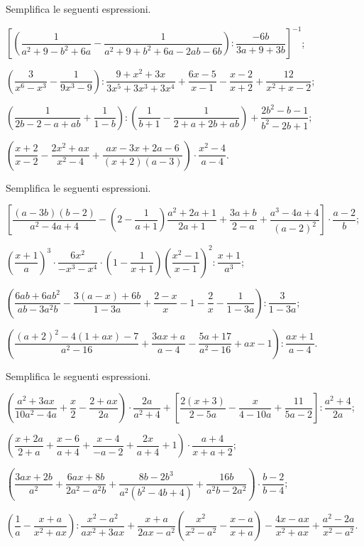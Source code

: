 \begin{esercizio}[\Ast]
\label{ese:14.50}
Semplifica le seguenti espressioni.
\begin{enumeratea}
 \item $\left[\left(\dfrac{1}{a^{2}+9-b^{2}+6a}-\dfrac{1}{a^{2}+9+b^{2}+6a-2ab-6b}\right):\dfrac{-6b}{3a+9+3b}\right]^{-1}$;
 \item $\left(\dfrac{3}{x^{6}-x^{3}}-\dfrac{1}{9x^{3}-9}\right):\dfrac{9+x^{2}+3x}{3x^{5}+3x^{3}+3x^{4}}+\dfrac{6x-5}{x-1}-\dfrac{x-2}{x+2}+\dfrac{12}{x^{2}+x-2}$;
 \item $\left(\dfrac{1}{2b-2-a+ab}+\dfrac{1}{1-b}\right):\left(\dfrac{1}{b+1}-\dfrac{1}{2+a+2b+ab}\right)+\dfrac{2b^{2}-b-1}{b^{2}-2b+1}$;
 \item $\left(\dfrac{x+2}{x-2}-\dfrac{2x^{2}+ax}{x^{2}-4}+\dfrac{ax-3x+2a-6}{(x+2)(a-3)}\right)\cdot {\dfrac{x^{2}-4}{a-4}}$.
\end{enumeratea}
\end{esercizio}

\begin{esercizio}[\Ast]
\label{ese:14.51}
Semplifica le seguenti espressioni.
\begin{enumeratea}
 \item $\left[\dfrac{(a-3b)(b-2)}{a^{2}-4a+4}-\left(2-\dfrac{1}{a+1}\right)\dfrac{a^{2}+2a+1}{2a+1}+\dfrac{3a+b}{2-a}+\dfrac{a^{3}-4a+4}{(a-2)^{2}}\right]\cdot {\dfrac{a-2}{b}}$;
 \item $\left(\dfrac{x+1}{a}\right)^{3}\cdot\dfrac{6x^{2}}{-x^{3}-x^{4}}\cdot \left(1-\dfrac{1}{x+1}\right)\left(\dfrac{x^{2}-1}{x-1}\right)^{2}:\dfrac{x+1}{a^{3}}$;
 \item $\left(\dfrac{6ab+6ab^{2}}{ab-3a^{2}b}-\dfrac{3(a-x)+6b}{1-3a}+\dfrac{2-x}{x}-1-\dfrac{2}{x}-\dfrac{1}{1-3a}\right):\dfrac{3}{1-3a}$;
 \item $\left(\dfrac{(a+2)^{2}-4(1+ax)-7}{a^{2}-16}+\dfrac{3ax+a}{a-4}-\dfrac{5a+17}{a^{2}-16}+ax-1\right):\dfrac{ax+1}{a-4}$.
\end{enumeratea}
\end{esercizio}

\begin{esercizio}[\Ast]
\label{ese:14.52}
Semplifica le seguenti espressioni.
\begin{enumeratea}
 \item $\left(\dfrac{a^{2}+3ax}{10a^{2}-4a}+\dfrac{x}{2}-\dfrac{2+ax}{2a}\right)\cdot {\dfrac{2a}{a^{2}+4}}+\left[\dfrac{2(x+3)}{2-5a}-\dfrac{x}{4-10a}+\dfrac{11}{5a-2}\right]:\dfrac{a^{2}+4}{2a}$;
 \item $\left(\dfrac{x+2a}{2+a}+\dfrac{x-6}{a+4}+\dfrac{x-4}{-a-2}+\dfrac{2x}{a+4}+1\right)\cdot{\dfrac{a+4}{x+a+2}}$;
 \item $\left(\dfrac{3ax+2b}{a^{2}}+\dfrac{6ax+8b}{2a^{2}-a^{2}b}+\dfrac{8b-2b^{3}}{a^{2}\left(b^{2}-4b+4\right)}+\dfrac{16b}{a^{2}b-2a^{2}}\right)\cdot {\dfrac{b-2}{b-4}}$;
 \item $\left(\dfrac{1}{a}-\dfrac{x+a}{x^{2}+ax}\right):\dfrac{x^{2}-a^{2}}{ax^2+3ax}+\dfrac{x+a}{2ax-a^{2}}\left(\dfrac{x^{2}}{x^{2}-a^{2}}-\dfrac{x-a}{x+a}\right)-\dfrac{4x-ax}{x^{2}+ax}+\dfrac{a^2-2a}{x^{2}-a^{2}}$.
\end{enumeratea}
\end{esercizio}

